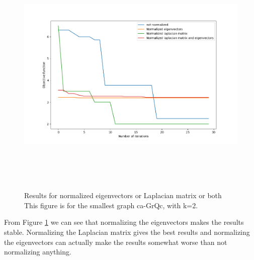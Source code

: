 \documentclass{article}
\begin{document}
\begin{figure}[htb]
\begin{center} 
\includegraphics[height=12cm]{normalization_plot.png}
\end{center}
\caption{Results for normalized eigenvectors or Laplacian matrix or both
This figure is for the smallest graph ca-GrQc, with k=2.}
\label{normalized}
\end{figure}



From Figure \ref{normalized} we can see that normalizing the eigenvectors
makes the results stable. Normalizing the Laplacian matrix gives the best results and
normalizing the eigenvectors can actually make the results somewhat worse than
not normalizing anything.
\end{document}
